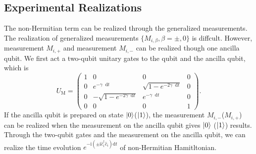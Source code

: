 \documentclass[longbibliography, aps, prx, amsmath, amssymb, amsfonts, twocolumn,superscriptaddress, footinbib]{revtex4-1}
\newcommand{\dif}{\mathop{}\!\mathrm{d}}
\begin{document}

	\subsection{Experimental Realizations}
	The non-Hermitian term can be realized through the generalized measurements. The realization of generalized measurements $\{M_{i,\beta}, \beta=\pm,0\}$ is diffcult. However, measurement $M_{i,+}$ and measurement $M_{i,-}$ can be realized though one ancilla qubit. We first act a two-qubit unitary gates to the qubit and the ancilla qubit, which is
	\begin{equation}
		U_{\text{M}} = \begin{pmatrix}
		  1 & 0 & 0 & 0\\
		  0 & e^{-\gamma \dif t} & \sqrt{1-e^{-2 \gamma \dif t}} & 0\\
		  0 & -\sqrt{1-e^{-2 \gamma \dif t}} & e^{-\gamma \dif t} & 0\\
		  0 & 0 & 0 & 1
		\end{pmatrix}.
	\end{equation}
	If the ancilla qubit is prepared on state $\ket{0}$($\ket{1}$), the measurement $M_{i,-}$($M_{i,+}$) can be realized when the measurement on the ancilla qubit gives $\ket{0}$ ($\ket{1}$) results. Through the two-qubit gates and the measurement on the ancilla qubit, we can realize the time evolution $e^{-\mathrm{i} (\pm \mathrm{i} \hat{c}_i^{\dagger}\hat{c}_i) \mathrm{d}t}$ of non-Hermitian Hamitltonian.

	
\end{document}
